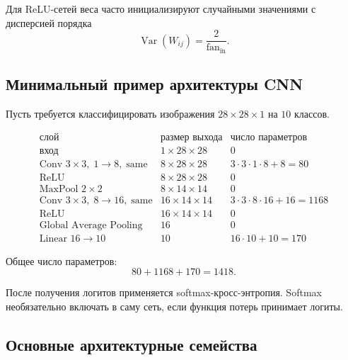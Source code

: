 \documentclass[12pt,a4paper]{article}
\numberwithin{equation}{section}
\theoremstyle{definition}
\theoremstyle{remark}
\begin{document}
Для ReLU-сетей веса часто инициализируют случайными значениями с
дисперсией порядка
\[
    \operatorname{Var}(W_{ij})
    =
    \frac{2}{\operatorname{fan}_{\mathrm{in}}}.
\]

\subsection{Минимальный пример архитектуры CNN}

Пусть требуется классифицировать изображения
\(28\times28\times1\) на \(10\) классов.

\[
\begin{array}{c|c|c}
    \text{слой}
    &
    \text{размер выхода}
    &
    \text{число параметров}\\
    \hline
    \text{вход}
    &
    1\times28\times28
    &
    0\\
    \text{Conv }3\times3,\;1\to8,\;\text{same}
    &
    8\times28\times28
    &
    3\cdot3\cdot1\cdot8+8=80\\
    \text{ReLU}
    &
    8\times28\times28
    &
    0\\
    \text{MaxPool }2\times2
    &
    8\times14\times14
    &
    0\\
    \text{Conv }3\times3,\;8\to16,\;\text{same}
    &
    16\times14\times14
    &
    3\cdot3\cdot8\cdot16+16=1168\\
    \text{ReLU}
    &
    16\times14\times14
    &
    0\\
    \text{Global Average Pooling}
    &
    16
    &
    0\\
    \text{Linear }16\to10
    &
    10
    &
    16\cdot10+10=170
\end{array}
\]

Общее число параметров:
\[
    80+1168+170=1418.
\]

После получения логитов применяется softmax-кросс-энтропия. Softmax
необязательно включать в саму сеть, если функция потерь принимает
логиты.

\subsection{Основные архитектурные семейства}
\end{document}
